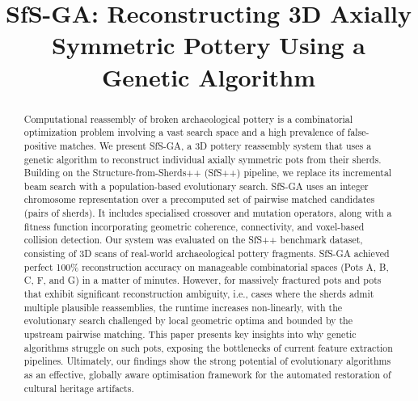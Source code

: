 \documentclass[conference]{IEEEtran}
\begin{document}
\title{SfS-GA: Reconstructing 3D Axially Symmetric Pottery Using a Genetic Algorithm}

\author{
}



\maketitle

\begin{abstract}
Computational reassembly of broken archaeological pottery is a combinatorial optimization problem involving a vast search space and a high prevalence of false-positive matches. We present SfS-GA, a 3D pottery reassembly system that uses a genetic algorithm to reconstruct individual axially symmetric pots from their sherds. Building on the Structure-from-Sherds++ (SfS++) pipeline, we replace its incremental beam search with a population-based evolutionary search. SfS-GA uses an integer chromosome representation over a precomputed set of pairwise matched candidates (pairs of sherds). It includes specialised crossover and mutation operators, along with a fitness function incorporating geometric coherence, connectivity, and voxel-based collision detection. Our system was evaluated on the SfS++ benchmark dataset, consisting of 3D scans of real-world archaeological pottery fragments. SfS-GA achieved perfect 100\% reconstruction accuracy on manageable combinatorial spaces (Pots A, B, C, F, and G) in a matter of minutes. However, for massively fractured pots and pots that exhibit significant reconstruction ambiguity, i.e., cases where the sherds admit multiple plausible reassemblies, the runtime increases non-linearly, with the evolutionary search challenged by local geometric optima and bounded by the upstream pairwise matching. This paper presents key insights into why genetic algorithms struggle on such pots, exposing the bottlenecks of current feature extraction pipelines. Ultimately, our findings show the strong potential of evolutionary algorithms as an effective, globally aware optimisation framework for the automated restoration of cultural heritage artifacts.
\end{abstract}
\end{document}
